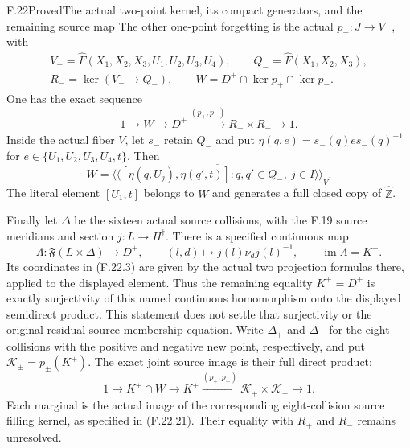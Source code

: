 \begin{claim}{F.22}{Proved}{The actual two-point kernel, its compact generators, and the remaining source map}
The other one-point forgetting is the actual
$p_-:J\to V_-$, with
\[
 \begin{gathered}
 V_-=\widehat F(X_1,X_2,X_3,U_1,U_2,U_3,U_4),\qquad
 Q_-=\widehat F(X_1,X_2,X_3),\\
 R_-=\ker(V_-\to Q_-),\qquad
 W=D^+\cap\ker p_+\cap\ker p_- .
 \end{gathered}                                                \tag{F.22.5}
\]
One has the exact sequence
\[
 1\longrightarrow W\longrightarrow D^+
        \xrightarrow{(p_+,p_-)}R_+\times R_-\longrightarrow1.
                                                               \tag{F.22.6}
\]
Inside the actual fiber $V$, let $s_-$ retain $Q_-$ and put
$\eta(q,e)=s_-(q)e s_-(q)^{-1}$ for
$e\in\{U_1,U_2,U_3,U_4,t\}$. Then
\[
 W=
 \overline{\langle\!\langle
       [\eta(q,U_j),\eta(q',t)]
       :q,q'\in Q_-,\ j\in I
                         \rangle\!\rangle}_{V} .
                                                               \tag{F.22.7}
\]
The literal element $[U_1,t]$ belongs to $W$ and
generates a full closed copy of $\widehat{\mathbb Z}$.

Finally let $\Delta$ be the sixteen actual source
collisions, with the F.19 source meridians and section
$j:L\to H^\dagger$. There is a specified continuous map
\[
 \Lambda:\mathfrak F(L\times\Delta)\longrightarrow D^+,
       \qquad(l,d)\longmapsto j(l)\nu_dj(l)^{-1},
       \qquad\operatorname{im}\Lambda=K^+ .
                                                               \tag{F.22.8}
\]
Its coordinates in (F.22.3) are given by the actual
two projection formulas there, applied to the displayed
element. Thus the remaining equality $K^+=D^+$ is
exactly surjectivity of this named continuous homomorphism
onto the displayed semidirect product. This statement
does not settle that surjectivity or the original
residual source-membership equation.
Write $\Delta_+$ and $\Delta_-$ for the eight collisions
with the positive and negative new point, respectively,
and put $\mathcal K_\pm=p_\pm(K^+)$. The exact joint
source image is their full direct product:
\[
 1\longrightarrow K^+\cap W\longrightarrow K^+
       \xrightarrow{(p_+,p_-)}\mathcal K_+\times\mathcal K_-
       \longrightarrow1 .
                                                              \tag{F.22.8a}
\]
Each marginal is the actual image of the corresponding
eight-collision source filling kernel, as specified
in (F.22.21). Their equality with $R_+$ and $R_-$
remains unresolved.
\end{claim}

